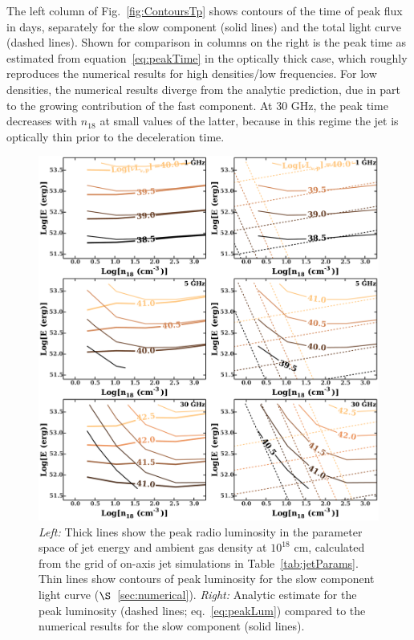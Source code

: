 \documentclass[usenatbib,fleqn]{mnras}
\begin{document}
The left column of Fig.~\ref{fig:ContoursTp} shows contours of the
time of peak flux in days, separately for the slow component (solid
lines) and the total light curve (dashed lines).  Shown for comparison
in columns on the right is the peak time as estimated from
equation~\eqref{eq:peakTime} in the optically thick case, which
roughly reproduces the numerical results for high densities/low
frequencies. For low densities, the numerical results diverge from the
analytic prediction, due in part to the growing contribution of the
fast component.  At 30 GHz, the peak time decreases with $n_{18}$ at
small values of the latter, because in this regime the jet is
optically thin prior to the deceleration time.




\begin{figure}
  \includegraphics[width=16cm]{lp_contours_new.pdf}
  \caption{\label{fig:jetContours} {\it {Left:}} Thick lines show the
    peak radio luminosity in the parameter space of jet energy and
    ambient gas density at $10^{18}$ cm, calculated from the grid of
    on-axis jet simulations in Table~\ref{tab:jetParams}. Thin lines
    show contours of peak luminosity for the slow component light
    curve ($\S$~\ref{sec:numerical}). {\it Right:} Analytic estimate
    for the peak luminosity (dashed lines; eq.~\ref{eq:peakLum})
    compared to the numerical results for the slow component (solid
    lines).}
\end{figure}
\end{document}
